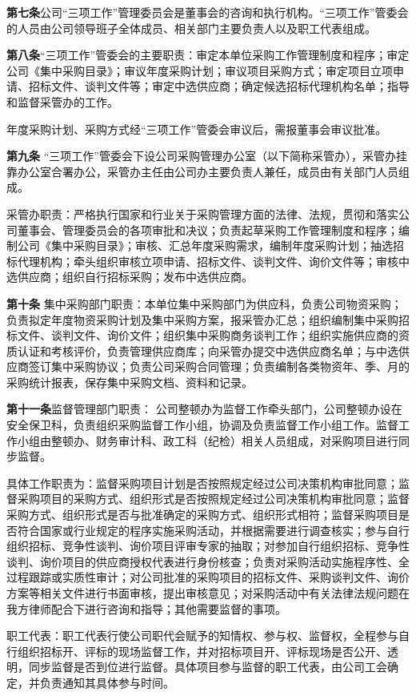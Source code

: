 \textbf{第七条}\quad 公司“三项工作”管理委员会是董事会的咨询和执行机构。“三项工作”管委会的人员由公司领导班子全体成员、相关部门主要负责人以及职工代表组成。

\textbf{第八条}\quad  “三项工作”管委会的主要职责：审定本单位采购工作管理制度和程序；审定公司《集中采购目录》；审议年度采购计划；审议项目采购方式；审定项目立项申请、招标文件、谈判文件等；审定中选供应商；确定候选招标代理机构名单；指导和监督采管办的工作。

年度采购计划、采购方式经“三项工作”管委会审议后，需报董事会审议批准。

\textbf{第九条 }\quad “三项工作”管委会下设公司采购管理办公室（以下简称采管办），采管办挂靠办公室合署办公，采管办主任由公司办主要负责人兼任，成员由有关部门人员组成。

采管办职责：严格执行国家和行业关于采购管理方面的法律、法规，贯彻和落实公司董事会、管理委员会的各项审批和决议；负责起草采购工作管理制度和程序；编制公司《集中采购目录》；审核、汇总年度采购需求，编制年度采购计划；抽选招标代理机构；牵头组织审核立项申请、招标文件、谈判文件、询价文件等；审核中选供应商；组织自行招标采购；发布中选供应商。

\textbf{第十条 }\quad 集中采购部门职责：本单位集中采购部门为供应科，负责公司物资采购；负责拟定年度物资采购计划及集中采购方案，报采管办汇总；组织编制集中采购招标文件、谈判文件、询价文件；组织集中采购商务谈判工作；组织实施供应商的资质认证和考核评价，负责管理供应商库；向采管办提交中选供应商名单；与中选供应商签订集中采购协议；负责公司采购合同管理；负责编制各类物资年、季、月的采购统计报表，保存集中采购文档、资料和记录。

\textbf{第十一条}\quad  监督管理部门职责：
公司整顿办为监督工作牵头部门，公司整顿办设在安全保卫科，负责组织采购监督工作小组，协调及负责监督工作小组工作。监督工作小组由整顿办、财务审计科、政工科（纪检）相关人员组成，对采购项目进行同步监督。

具体工作职责为：监督采购项目计划是否按照规定经过公司决策机构审批同意；监督采购项目的采购方式、组织形式是否按照规定经过公司决策机构审批同意；监督采购方式、组织形式是否与批准确定的采购方式、组织形式相符；监督采购项目是否符合国家或行业规定的程序实施采购活动，并根据需要进行调查核实；参与自行组织招标、竞争性谈判、询价项目评审专家的抽取；对参加自行组织招标、竞争性谈判、询价项目的供应商授权代表进行身份核查；负责对采购活动实施程序性、全过程跟踪或实质性审计；对公司批准的采购项目的招标文件、采购谈判文件、询价方案等相关文件进行书面审核，提出审核意见；对采购活动中有关法律法规问题在我方律师配合下进行咨询和指导；其他需要监督的事项。

职工代表：职工代表行使公司职代会赋予的知情权、参与权、监督权，全程参与自行组织招标开、评标的现场监督工作，并对招标项目开、评标现场是否公开、透明，同步监督是否到位进行监督。具体项目参与监督的职工代表，由公司工会确定，并负责通知其具体参与时间。

